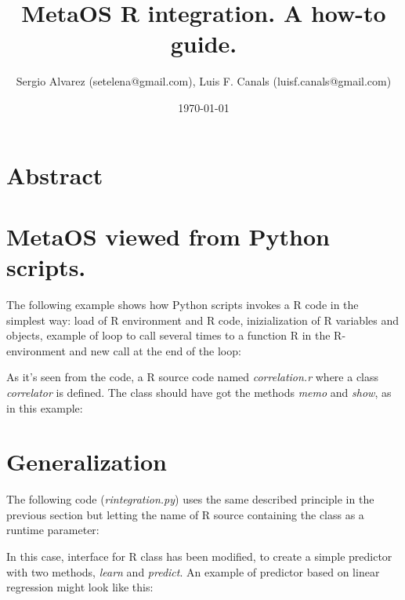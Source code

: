 \documentclass[11pt,a4paper]{article}
\title{MetaOS R integration. A how-to guide.}
\author{Sergio Alvarez (setelena@gmail.com),
    Luis F. Canals (luisf.canals@gmail.com)}
\begin{document}
\date{\today}
\maketitle


\section{Abstract}

\section{MetaOS viewed from Python scripts.}

The following example shows how Python scripts invokes a R code in 
the simplest way: load of R environment and R code, inizialization of R
variables and objects, example of loop to call several times to a function
R in the R-environment and new call at the end of the loop:

\lstset{language=Python,frame=single,tabsize=2,basicstyle=\tiny}


As it's seen from the code, a R source code named \emph{correlation.r}
where a class \emph{correlator} is defined. The class should have got the
methods \emph{memo} and \emph{show}, as in this example:

\lstset{language=R,frame=single,tabsize=2,basicstyle=\tiny}




\section{Generalization}

The following code (\emph{rintegration.py}) uses the same described principle 
in the previous section but letting the name of R source containing the 
class as a runtime parameter:

\lstset{language=Python,frame=single,tabsize=2,basicstyle=\tiny}


In this case, interface for R class has been modified, to create a simple
predictor with two methods, \emph{learn} and \emph{predict}. An example of
predictor based on linear regression might look like this:
\end{document}
